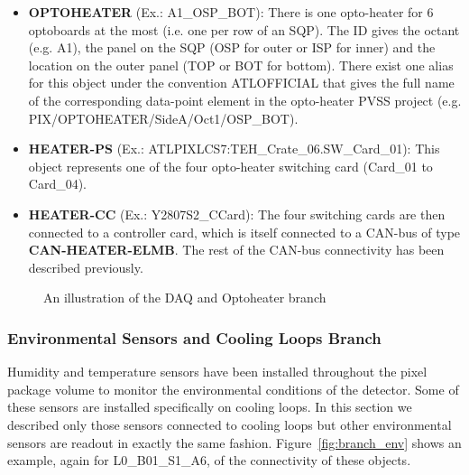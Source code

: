 \begin{itemize}
\item {\bf OPTOHEATER} (Ex.: A1\_OSP\_BOT): There is one opto-heater for 6 optoboards
at the most (i.e. one per row of an SQP). The ID gives the octant (e.g. A1), the panel on 
the SQP (OSP for outer or ISP for inner) and the location on the outer panel
(TOP or BOT for bottom). There exist one alias for this object under the convention
ATLOFFICIAL that gives the full name of the corresponding data-point element in 
the opto-heater PVSS project (e.g. PIX/OPTOHEATER/SideA/Oct1/OSP\_BOT).
\item {\bf HEATER-PS} (Ex.: ATLPIXLCS7:TEH\_Crate\_06.SW\_Card\_01): This object
represents one of the four opto-heater switching card (Card\_01 to Card\_04). 
\item {\bf HEATER-CC} (Ex.: Y2807S2\_CCard): The four switching cards are then connected
to a controller card, which is itself connected to a CAN-bus of type {\bf CAN-HEATER-ELMB}.
The rest of the CAN-bus connectivity has been described previously.
\end{itemize}

\begin{figure}
\begin{center}
\end{center}
\caption{An illustration of the DAQ and Optoheater branch}
\label{fig:branch_daq_optoheater}
\end{figure}

\subsubsection{Environmental Sensors and Cooling Loops Branch}

Humidity and temperature sensors have been installed throughout the pixel package
volume to monitor the environmental conditions of the detector. Some of these sensors are installed
specifically on cooling loops. In this section we described only those sensors connected
to cooling loops but other environmental sensors are readout in exactly the same
fashion. Figure~\ref{fig:branch_env} shows an example, again for L0\_B01\_S1\_A6,
of the connectivity of these objects.

